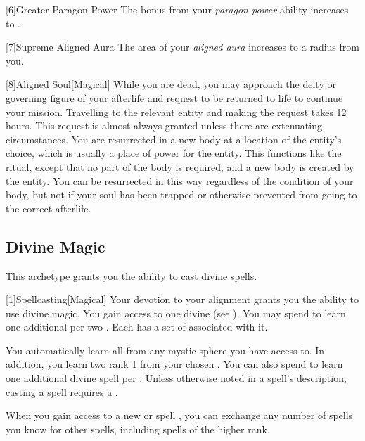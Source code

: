         [6]{Greater Paragon Power} The bonus from your \textit{paragon power} ability increases to .

        [7]{Supreme Aligned Aura}
        The area of your \textit{aligned aura} increases to a \arealarge radius  from you.

        [8]{Aligned Soul}[Magical]
        While you are dead, you may approach the deity or governing figure of your afterlife and request to be returned to life to continue your mission.
        Travelling to the relevant entity and making the request takes 12 hours.
        This request is almost always granted unless there are extenuating circumstances.
        You are resurrected in a new body at a location of the entity's choice, which is usually a place of power for the entity.
        This functions like the  ritual, except that no part of the body is required, and a new body is created by the entity.
        You can be resurrected in this way regardless of the condition of your body, but not if your soul has been trapped or otherwise prevented from going to the correct afterlife.

    \subsection{Divine Magic}
        This archetype grants you the ability to cast divine spells.

        [1]{Spellcasting}[Magical]
        Your devotion to your alignment grants you the ability to use divine magic.
        You gain access to one divine  (see ).
        You may spend  to learn one additional  per two .
        Each  has a set of  associated with it.

        You automatically learn all  from any mystic sphere you have access to.
        In addition, you learn two rank 1  from your chosen .
        You can also spend  to learn one additional divine spell per .
        Unless otherwise noted in a spell's description, casting a spell requires a .

        When you gain access to a new  or spell ,
            you can exchange any number of spells you know for other spells,
            including spells of the higher rank.

